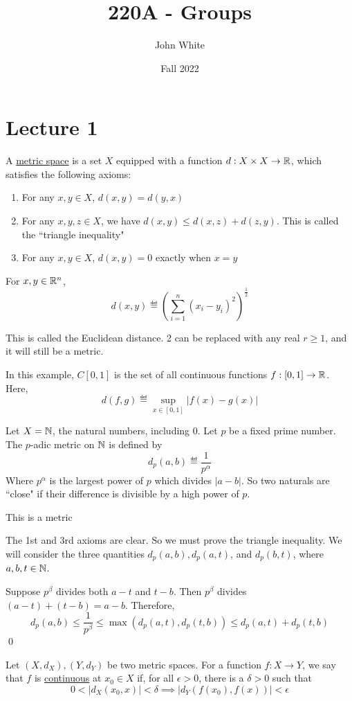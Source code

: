 \documentclass[x11names,reqno,14pt]{extarticle}
\title{220A - Groups}
\author{John White}
\date{Fall 2022}
\begin{document}
\section*{Lecture 1}


A \underline{metric space} is a set $X$ equipped with a function $d:X\times X \to \mathbb{R}$, which satisfies the following axioms:
\begin{enumerate}
	\item For any $x, y \in X$, $d(x, y) = d(y, x)$
	\item For any $x, y, z \in X$, we have $d(x, y) \leq d(x, z) + d(z, y)$. This is called the ``triangle inequality"
	\item For any $x, y \in X$, $d(x, y) = 0$ exactly when $x = y$

\end{enumerate}

\exm

For $x, y \in \mathbb{R}^n$, 
\[
d(x, y) \eqdef \left(\sum_{i=1}^n(x_i - y_i)^2\right)^{\frac{1}{2}}
\]

This is called the Euclidean distance. 2 can be replaced with any real $r \geq 1$, and it will still be a metric. 

\exm 

In this example, $C[0, 1]$ is the set of all continuous functions $f:[0, 1]\to\mathbb{R}$. Here, 
\[
d(f, g) \eqdef \sup_{x\in[0,1]}|f(x)- g(x)|
\]

\exm

Let $X = \mathbb{N}$, the natural numbers, including $0$. Let $p$ be a fixed prime number. The $p$-adic metric on $\mathbb{N}$ is defined by 
\[
d_p(a, b) \eqdef \frac{1}{p^\alpha} 
\]
Where $p^\alpha$ is the largest power of $p$ which divides $|a - b|$. So two naturals are ``close" if their difference is divisible by a high power of $p$. 

\claim This is a metric

\proof
The 1st and 3rd axioms are clear. So we must prove the triangle inequality. We will consider the three quantities $d_p(a, b), d_p(a, t)$, and $d_p(b, t)$, where $a, b, t \in \mathbb{N}$. 

Suppose $p^\beta$ divides both $a - t$ and $t - b$. Then $p^\beta$ divides $(a - t) + (t - b) = a - b$. Therefore, 
\[
d_p(a, b) \leq \frac{1}{p^\beta} \leq \max(d_p(a, t), d_p(t, b)) \leq d_p(a, t) + d_p(t, b)
\]
\qed


Let $(X, d_X), (Y, d_Y)$ be two metric spaces. For a function $f:X\to Y$, we say that $f$ is \underline{continuous} at $x_0 \in X$ if, for all $\epsilon > 0$, there is a $\delta > 0$ such that 
\[
0 < |d_X(x_0, x)| < \delta \implies |d_Y(f(x_0), f(x))| < \epsilon
\]
\end{document}
